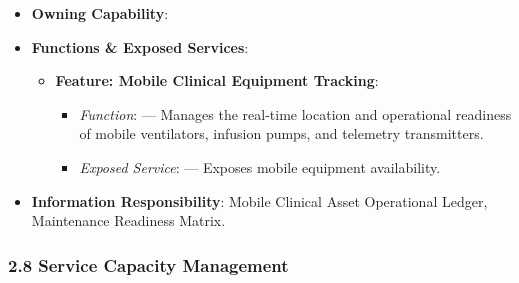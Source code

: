 \begin{itemize}

\item 
\textbf{Owning Capability}: \texttt{}



\item 
\textbf{Functions \& Exposed Services}:


\begin{itemize}

\item 
\textbf{Feature: Mobile Clinical Equipment Tracking}:


\begin{itemize}

\item 
\emph{Function}: \texttt{} — Manages the real-time location and operational readiness of mobile ventilators, infusion pumps, and telemetry transmitters.



\item 
\emph{Exposed Service}: \texttt{} — Exposes mobile equipment availability.



\end{itemize}


\end{itemize}


\item 
\textbf{Information Responsibility}: Mobile Clinical Asset Operational Ledger, Maintenance Readiness Matrix.



\end{itemize}
\label{rad:hso:176}

\par\smallskip
{}\label{rad:hso:178}
\subsubsection*{2.8 Service Capacity Management}
\label{rad:hso:179}


